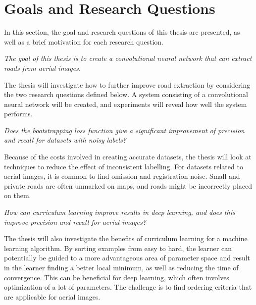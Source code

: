 \section{Goals and Research Questions}
\label{sec:Goals and Research Questions}
In this section, the goal and research questions of this thesis are presented, as well as a brief motivation for each research question.

\begin{description}[ style=nextline, leftmargin=1.5em, rightmargin=1.5em]
\item[Goal statement:]{\it The goal of this thesis is to create a convolutional neural network that can extract roads from aerial images.}
\end{description}

The thesis will investigate how to further improve road extraction by considering the two research questions defined below. A system consisting of a convolutional neural network will be created, and experiments will reveal how well the system performs.

\begin{description}[ style=nextline, leftmargin=1.5em, rightmargin=1.5em]
\item[Research question 1:]{\it Does the bootstrapping loss function give a significant improvement of precision and recall for datasets with noisy labels?}
\end{description}

Because of the costs involved in creating accurate datasets, the thesis will look at techniques to reduce the effect of inconsistent labelling. For datasets related to aerial images, it is common to find omission and registration noise. Small and private roads are often unmarked on maps, and roads might be incorrectly placed on them.

\begin{description}[ style=nextline, leftmargin=1.5em, rightmargin=1.5em]
\item[Research question 2:]{\it How can curriculum learning improve results in deep learning, and does this improve precision and recall for aerial images?}
\end{description}

The thesis will also investigate the benefits of curriculum learning for a machine learning algorithm. By sorting examples from easy to hard, the learner can potentially be guided to a more advantageous area of parameter space and result in the learner finding a better local minimum, as well as reducing the time of convergence. This can be beneficial for deep learning, which often involves optimization of a lot of parameters. The challenge is to find ordering criteria that are applicable for aerial images. 
